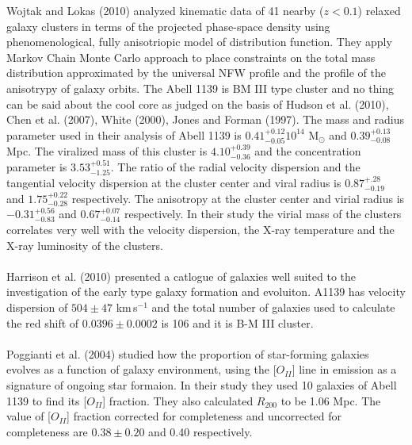 Wojtak and Lokas (2010) analyzed kinematic data of 41 nearby ($z<0.1$) relaxed galaxy clusters in terms of the projected phase-space density using phenomenological, fully anisotriopic model of distribution function. They apply Markov Chain Monte Carlo approach to place constraints on the total mass distribution approximated by the universal NFW profile and the profile of the anisotrypy of galaxy orbits. The  Abell 1139 is BM III type cluster and no thing can be said about the cool core as judged on the basis of Hudson et al. (2010), Chen et al. (2007), White (2000), Jones and Forman (1997). The mass and radius parameter used in their analysis of Abell 1139 is $0.41^{+0.12}_{-0.05}10^{14}$ M$_{\odot}$ and $0.39^{+0.13}_{-0.08}$ Mpc. The viralized mass of this cluster is $4.10^{+0.39}_{-0.36}$ and the concentration parameter is $3.53^{+0.51}_{-1.25}$. The ratio of the radial velocity dispersion and the tangential velocity dispersion at the cluster center and viral radius is $0.87^{+.28}_{-0.19}$ and $1.75^{+0.22}_{-0.28}$ respectively. The anisotropy at the cluster center and virial radius is $-0.31^{+0.56}_{-0.83}$ and $0.67^{+0.07}_{-0.14}$ respectively. In their study the virial mass of the clusters correlates very well with the velocity dispersion, the X-ray temperature and the X-ray luminosity of the clusters.\\\\
Harrison et al. (2010) presented a catlogue of galaxies well suited to the investigation of the early type galaxy formation and evoluiton. A1139 has velocity dispersion of $504\pm 47$ km\,s$^{-1}$ and the total number of galaxies used to calculate the red shift of $0.0396\pm 0.0002$ is 106 and it is B-M III cluster.\\\\
Poggianti et al. (2004) studied how the proportion of star-forming galaxies evolves as a function of galaxy environment, using the [$O_{II}$] line in emission as a signature of ongoing star formaion. In their study they used 10 galaxies of Abell 1139 to find its [$O_{II}$] fraction. They also calculated $R_{200}$ to be 1.06 Mpc. The value of [$O_{II}$] fraction corrected for completeness and uncorrected for completeness are $0.38\pm0.20$ and 0.40 respectively.\\\\
